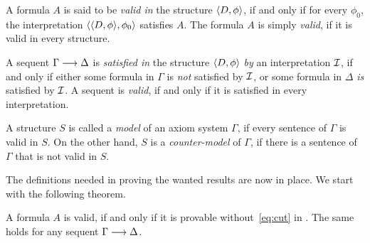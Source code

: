 \documentclass[11pt,a4paper]{article}
\begin{document}
\begin{definition}\label{def:valid formula}
    A formula \(A\) is said to be \emph{valid in} the structure \(\langle D,\phi\rangle\),
    if and only if for every \(\phi_0\),
    the interpretation \(\langle\langle D,\phi\rangle,\phi_0\rangle\)
    satisfies \(A\). The formula \(A\) is simply \emph{valid}, if
    it is valid in every structure.
\end{definition}

\begin{definition}%
\label{def:satisfied and valid sequents}
A sequent \(\Gamma\longrightarrow\Delta\) is \emph{satisfied in} the structure
\(\langle D,\phi\rangle\) \emph{by} an interpretation \(\mathcal{I}\),
if and only if either some formula in \(\Gamma\) is \emph{not}
satisfied by \(\mathcal{I}\), or some formula in \(\Delta\) \emph{is}
satisfied by \(\mathcal{I}\). A sequent is \emph{valid}, if and only if
it is satisfied in every interpretation.
\end{definition}

\begin{definition}%
\label{def:model and counter-model}
A structure \(S\) is called a \emph{model} of an axiom system
\(\Gamma\), if every sentence of \(\Gamma\) is valid in \(S\).
On the other hand, \(S\) is a \emph{counter-model} of \(\Gamma\),
if there is a sentence of \(\Gamma\) that is not valid in \(S\).
\end{definition}

The definitions needed in proving the wanted results
are now in place. We start with the following theorem.

\begin{theorem}\label{the:8.2}
    A formula \(A\) is valid,
    if and only if it is provable without~\eqref{eq:cut} in \LK{}.
    The same holds for any sequent \(\Gamma\longrightarrow\Delta\).
\end{theorem}
\end{document}
